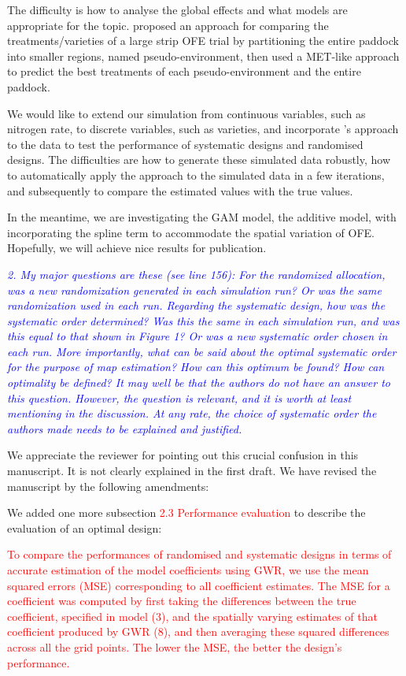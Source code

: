 \documentclass[a4paper]{article}   	%
\newcommand{\revision}[1]{\textcolor{red}{#1}}
\newcommand{\reviewer}[1]{\textcolor{blue}{\textit{#1}}}
\begin{document}
The difficulty is how to analyse the global effects and what models are appropriate for the topic. \textcite{Stefanova2023Statistical} proposed an approach for comparing the treatments/varieties of a large strip OFE trial by partitioning the entire paddock into smaller regions, named pseudo-environment, then used a MET-like approach to predict the best treatments of each pseudo-environment and the entire paddock. 

We would like to extend our simulation from continuous variables, such as nitrogen rate, to discrete variables, such as varieties, and incorporate \textcite{Stefanova2023Statistical}'s approach to the data to test the performance of systematic designs and randomised designs. The difficulties are how to generate these simulated data robustly,  how to automatically apply the approach to the simulated data in a few iterations, and subsequently to compare the estimated values with the true values.

In the meantime, we are investigating the GAM model, the additive model, with incorporating the spline term to accommodate the spatial variation of OFE. Hopefully, we will achieve nice results for publication. 


\reviewer{2. My major questions are these (see line 156): For the randomized allocation, was a new randomization generated in each simulation run? Or was the same randomization used in each run. Regarding the systematic design, how was the systematic order determined? Was this the same in each simulation run, and was this equal to that shown in Figure 1? Or was a new systematic order chosen in each run. More importantly, what can be said about the optimal systematic order for the purpose of map estimation? How can this optimum be found? How can optimality be defined? It may well be that the authors do not have an answer to this question. However, the question is relevant, and it is worth at least mentioning in the discussion. At any rate, the choice of systematic order the authors made needs to be explained and justified.}

We appreciate the reviewer for pointing out this crucial confusion in this manuscript. It is not clearly explained in the first draft. We have revised the manuscript by the following amendments: 



We added one more subsection \revision{2.3 Performance evaluation} to describe the evaluation of an optimal design: 

\revision{To compare the performances of randomised and systematic designs in terms of accurate estimation of the model coefficients using GWR, we use the mean squared errors (MSE) corresponding to all coefficient estimates. The MSE for a coefficient was computed by first taking the differences between the true coefficient, specified in model (3), and the spatially varying estimates of that coefficient produced by GWR (8), and then averaging these squared differences across all the grid points. The lower the MSE, the better the design’s performance.}
\end{document}

